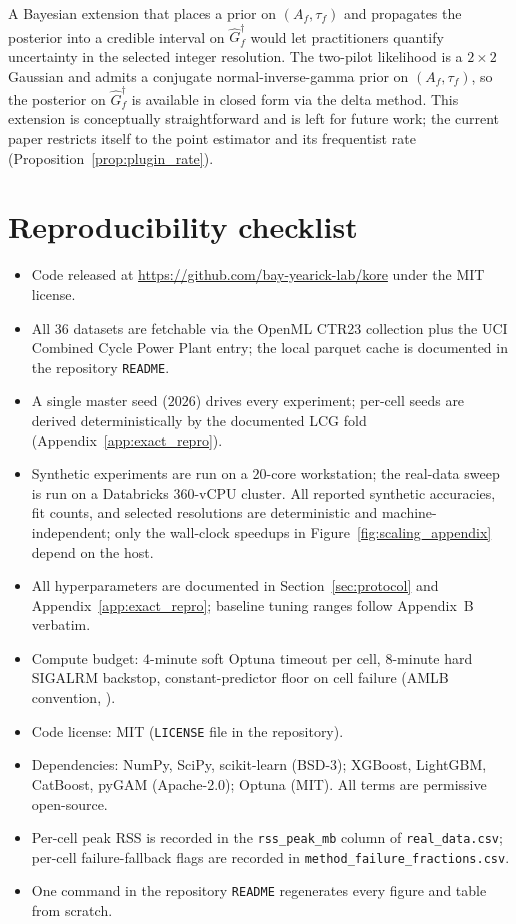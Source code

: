 \documentclass{article}
\begin{document}
A Bayesian extension that places a prior on $(A_f, \tau_f)$ and propagates the posterior into a credible interval on $\widehat G_f^\dagger$ would let practitioners quantify uncertainty in the selected integer resolution. The two-pilot likelihood is a $2 \times 2$ Gaussian and admits a conjugate normal-inverse-gamma prior on $(A_f, \tau_f)$, so the posterior on $\widehat G_f^\dagger$ is available in closed form via the delta method. This extension is conceptually straightforward and is left for future work; the current paper restricts itself to the point estimator and its frequentist rate (Proposition~\ref{prop:plugin_rate}).

\section*{Reproducibility checklist}

\begin{itemize}
\item Code released at \url{https://github.com/bay-yearick-lab/kore} under the MIT license.
\item All $36$ datasets are fetchable via the OpenML CTR23 collection plus the UCI Combined Cycle Power Plant entry; the local parquet cache is documented in the repository \texttt{README}.
\item A single master seed ($2026$) drives every experiment; per-cell seeds are derived deterministically by the documented LCG fold (Appendix~\ref{app:exact_repro}).
\item Synthetic experiments are run on a $20$-core workstation; the real-data sweep is run on a Databricks $360$-vCPU cluster. All reported synthetic accuracies, fit counts, and selected resolutions are deterministic and machine-independent; only the wall-clock speedups in Figure~\ref{fig:scaling_appendix} depend on the host.
\item All hyperparameters are documented in Section~\ref{sec:protocol} and Appendix~\ref{app:exact_repro}; baseline tuning ranges follow \citet{grinsztajn2022tree} Appendix~B verbatim.
\item Compute budget: $4$-minute soft Optuna timeout per cell, $8$-minute hard SIGALRM backstop, constant-predictor floor on cell failure (AMLB convention, \citealp{gijsbers2024amlb}).
\item Code license: MIT (\texttt{LICENSE} file in the repository).
\item Dependencies: NumPy, SciPy, scikit-learn (BSD-3); XGBoost, LightGBM, CatBoost, pyGAM (Apache-2.0); Optuna (MIT). All terms are permissive open-source.
\item Per-cell peak RSS is recorded in the \texttt{rss\_peak\_mb} column of \texttt{real\_data.csv}; per-cell failure-fallback flags are recorded in \texttt{method\_failure\_fractions.csv}.
\item One command in the repository \texttt{README} regenerates every figure and table from scratch.
\end{itemize}
\end{document}
